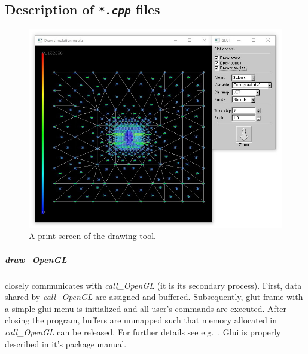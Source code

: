 \documentclass[preprint,12pt,authoryear]{elsarticle}
\begin{document}
\subsection{Description of \texttt{\emph{*.cpp}} files}
\label{SubSect:5.3}
%
%
%
\begin{figure}
	\centering
	\includegraphics[scale=0.4]{figs/drawing_tool.jpg}
	\caption{A print screen of the drawing tool.}
	\label{SubSect:5.3:Fig:1}
\end{figure}
%
\subparagraph{draw\_OpenGL} closely communicates with \emph{call\_OpenGL} (it is its secondary process). First, data shared by \emph{call\_OpenGL} are assigned and buffered. Subsequently, glut frame with a simple glui menu is initialized and all user's commands are executed. After closing the program, buffers are unmapped such that memory allocated in \emph{call\_OpenGL} can be released. For further details see e.g.~\cite{Hill:OpenGL}. Glui is properly described in it's package manual.
\end{document}
